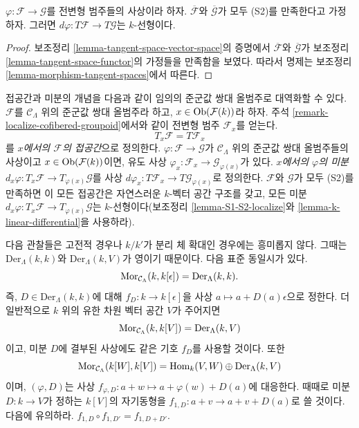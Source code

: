 \begin{lemma}
\label{lemma-k-linear-differential}
$\varphi : \mathcal{F} \to \mathcal{G}$를 전변형 범주들의
사상이라 하자. $\overline{\mathcal{F}}$와
$\overline{\mathcal{G}}$가 모두 (S2)를 만족한다고 가정하자.
그러면 $d \varphi : T \mathcal{F} \to T \mathcal{G}$는
$k$-선형이다.
\end{lemma}

\begin{proof}
보조정리 \ref{lemma-tangent-space-vector-space}의 증명에서
$\overline{\mathcal{F}}$와 $\overline{\mathcal{G}}$가 보조정리
\ref{lemma-tangent-space-functor}의 가정들을 만족함을 보였다.
따라서 명제는 보조정리
\ref{lemma-morphism-tangent-spaces}에서 따른다.
\end{proof}

\begin{remark}
\label{remark-tangent-space-cofibered-groupoid}
접공간과 미분의 개념을 다음과 같이 임의의 준군값 쌍대 올범주로
대역화할 수 있다. $\mathcal{F}$를 $\mathcal{C}_\Lambda$ 위의
준군값 쌍대 올범주라 하고,
$x \in \mathop{\mathrm{Ob}}\nolimits(\mathcal{F}(k))$라 하자. 주석
\ref{remark-localize-cofibered-groupoid}에서와 같이 전변형 범주
$\mathcal{F}_x$를 얻는다.
$$
T_x\mathcal{F} = T\mathcal{F}_x
$$
를 {\it $x$에서의 $\mathcal{F}$의 접공간}으로 정의한다.
$\varphi : \mathcal{F} \to \mathcal{G}$가
$\mathcal{C}_\Lambda$ 위의 준군값 쌍대 올범주들의 사상이고
$x \in \mathop{\mathrm{Ob}}\nolimits(\mathcal{F}(k))$이면, 유도 사상
$\varphi_x: \mathcal{F}_x \to \mathcal{G}_{\varphi(x)}$가 있다.
{\it $x$에서의 $\varphi$의 미분
$d_x \varphi : T_x \mathcal{F} \to T_{\varphi(x)} \mathcal{G}$}를
사상 $d \varphi_x: T \mathcal{F}_x \to
T \mathcal{G}_{\varphi(x)}$로 정의한다.
$\mathcal{F}$와 $\mathcal{G}$가 모두 (S2)를 만족하면 이 모든
접공간은 자연스러운 $k$-벡터 공간 구조를 갖고, 모든 미분
$d_x \varphi : T_x \mathcal{F} \to T_{\varphi(x)} \mathcal{G}$는
$k$-선형이다(보조정리 \ref{lemma-S1-S2-localize}와
\ref{lemma-k-linear-differential}을 사용하라).
\end{remark}

\noindent
다음 관찰들은 고전적 경우나 $k/k'$가 분리 체 확대인 경우에는
흥미롭지 않다. 그때는 $\text{Der}_\Lambda(k, k)$와
$\text{Der}_\Lambda(k, V)$가 영이기 때문이다.
다음 표준 동일시가 있다.
$$
\mathop{\mathrm{Mor}}\nolimits_{\mathcal{C}_\Lambda}(k, k[\epsilon]) =
\text{Der}_\Lambda(k, k).
$$
즉, $D \in \text{Der}_\Lambda(k, k)$에 대해
$f_D : k \to k[\epsilon]$을 사상 $a \mapsto a + D(a)\epsilon$으로
정한다. 더 일반적으로 $k$ 위의 유한 차원 벡터 공간 $V$가 주어지면
$$
\mathop{\mathrm{Mor}}\nolimits_{\mathcal{C}_\Lambda}(k, k[V]) =
\text{Der}_\Lambda(k, V)
$$
이고, 미분 $D$에 결부된 사상에도 같은 기호 $f_D$를 사용할 것이다.
또한
$$
\mathop{\mathrm{Mor}}\nolimits_{\mathcal{C}_\Lambda}(k[W], k[V]) =
\mathop{\mathrm{Hom}}\nolimits_k(V, W) \oplus \text{Der}_\Lambda(k, V)
$$
이며, $(\varphi, D)$는 사상
$f_{\varphi, D} : a + w \mapsto a + \varphi(w) + D(a)$에 대응한다.
때때로 미분 $D : k \to V$가 정하는 $k[V]$의 자기동형을
$f_{1, D} : a + v \to a + v + D(a)$로 쓸 것이다. 다음에 유의하라.
$f_{1, D} \circ f_{1, D'} = f_{1, D + D'}$.

